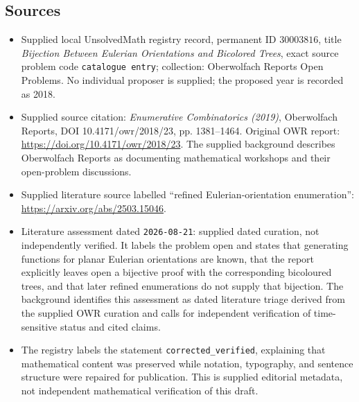 \documentclass[11pt]{article}
\begin{document}
\subsection{Sources}
\begin{itemize}
\item Supplied local UnsolvedMath registry record, permanent ID \(30003816\), title \emph{Bijection Between Eulerian Orientations and Bicolored Trees}, exact source problem code \texttt{catalogue entry}; collection: Oberwolfach Reports Open Problems. No individual proposer is supplied; the proposed year is recorded as 2018.
\item Supplied source citation: \emph{Enumerative Combinatorics (2019)}, Oberwolfach Reports, DOI 10.4171/owr/2018/23, pp. 1381--1464. Original OWR report: \url{https://doi.org/10.4171/owr/2018/23}. The supplied background describes Oberwolfach Reports as documenting mathematical workshops and their open-problem discussions.
\item Supplied literature source labelled ``refined Eulerian-orientation enumeration'': \url{https://arxiv.org/abs/2503.15046}.
\item Literature assessment dated \texttt{2026-08-21}: supplied dated curation, not independently verified. It labels the problem open and states that generating functions for planar Eulerian orientations are known, that the report explicitly leaves open a bijective proof with the corresponding bicoloured trees, and that later refined enumerations do not supply that bijection. The background identifies this assessment as dated literature triage derived from the supplied OWR curation and calls for independent verification of time-sensitive status and cited claims.
\item The registry labels the statement \texttt{corrected\_verified}, explaining that mathematical content was preserved while notation, typography, and sentence structure were repaired for publication. This is supplied editorial metadata, not independent mathematical verification of this draft.
\end{itemize}
\end{document}
